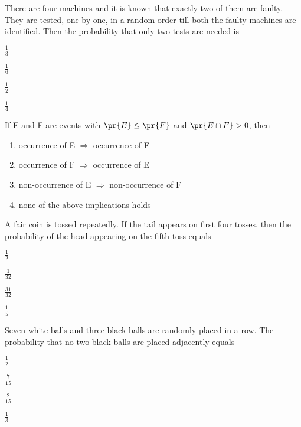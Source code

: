 \item There are four machines and it is known that exactly two of them are faulty. They are tested, one by one, in a random order till both the faulty machines are identified. Then the probability that only two tests are needed is
\hfill{}
\begin{enumerate}
\begin{multicols}{4}
\item $\frac{1}{3}$
\columnbreak
\item $\frac{1}{6}$
\columnbreak
\item $\frac{1}{2}$
\columnbreak
\item $\frac{1}{4}$
\end{multicols}
\end{enumerate}
\item If E and F are events with $\pr{E} \leq \pr{F}$ and $\pr{E\cap F}>0$, then
\hfill{}
\begin{enumerate}
\item occurrence of E $\Rightarrow$ occurrence of F
\item occurrence of F $\Rightarrow$ occurrence of E
\item non-occurrence of E $\Rightarrow$ non-occurrence of F
\item none of the above implications holds
\end{enumerate}
\item A fair coin is tossed repeatedly. If the tail appears on first four tosses, then the probability of the head appearing on the fifth toss equals
\hfill{}
\begin{enumerate}
\begin{multicols}{4}
\item $\frac{1}{2}$
\columnbreak
\item $\frac{1}{32}$
\columnbreak
\item $\frac{31}{32}$
\columnbreak
\item $\frac{1}{5}$
\end{multicols}
\end{enumerate}
\item Seven white balls and three black balls are randomly placed in a row. The probability that no two black balls are placed adjacently equals
\hfill{}
\begin{enumerate}
\begin{multicols}{4}
\item $\frac{1}{2}$
\columnbreak
\item $\frac{7}{15}$
\columnbreak
\item $\frac{2}{15}$
\columnbreak
\item $\frac{1}{3}$
\end{multicols}
\end{enumerate}
